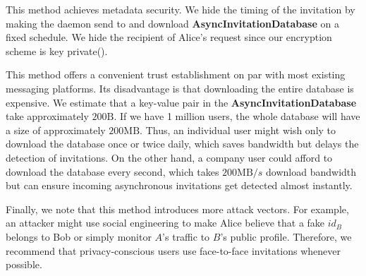 This method achieves metadata security. We hide the timing of the invitation by making the daemon send to and download \textbf{AsyncInvitationDatabase} on a fixed schedule. 
We hide the recipient of Alice's request since our encryption scheme is key private(). 

This method offers a convenient trust establishment on par with most existing messaging platforms. 
Its disadvantage is that downloading the entire database is expensive. 
We estimate that a key-value pair in the \textbf{AsyncInvitationDatabase} take approximately $200\text{B}$. 
If we have 1 million users, the whole database will have a size of approximately $200\text{MB}$.
Thus, an individual user might wish only to download the database once or twice daily, which saves bandwidth but delays the detection of invitations. 
On the other hand, a company user could afford to download the database every second, which takes $200\text{MB}/s$ download bandwidth but can ensure incoming asynchronous invitations get detected almost instantly.

Finally, we note that this method introduces more attack vectors. For example, an attacker might use social engineering to make Alice believe that a fake $id_B$ belongs to Bob or simply monitor $A$'s traffic to $B$'s public profile. Therefore, we recommend that privacy-conscious users use face-to-face invitations whenever possible.

